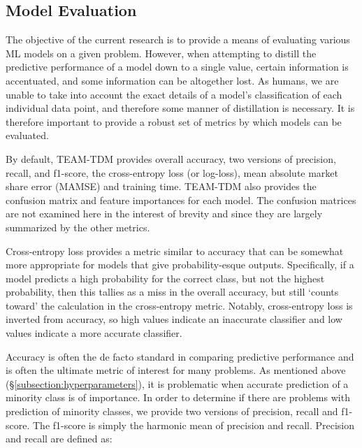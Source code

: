 \documentclass[numbered]{trbunofficial}
\begin{document}
\subsection{Model Evaluation} \label{subsection:evaluation}

The objective of the current research is to provide a means of evaluating various ML models on a given problem.
 However, when attempting to distill the predictive performance of a model down to a single value, certain information is accentuated, and some information can be altogether lost.
 As humans, we are unable to take into account the exact details of a model's classification of each individual data point, and therefore some manner of distillation is necessary.
 It is therefore important to provide a robust set of metrics by which models can be evaluated.

By default, TEAM-TDM provides overall accuracy, two versions of precision, recall, and f1-score, the cross-entropy loss (or log-loss), mean absolute market share error (MAMSE) and training time.
 TEAM-TDM also provides the confusion matrix and feature importances for each model.
 The confusion matrices are not examined here in the interest of brevity and since they are largely summarized by the other metrics.

Cross-entropy loss provides a metric similar to accuracy that can be somewhat more appropriate for models that give probability-esque outputs.
 Specifically, if a model predicts a high probability for the correct class, but not the highest probability, then this tallies as a miss in the overall accuracy, but still `counts toward' the calculation in the cross-entropy metric.
 Notably, cross-entropy loss is inverted from accuracy, so high values indicate an inaccurate classifier and low values indicate a more accurate classifier.

Accuracy is often the de facto standard in comparing predictive performance and is often the ultimate metric of interest for many problems.
 As mentioned above (\S \ref{subsection:hyperparameters}), it is problematic when accurate prediction of a minority class is of importance.
 In order to determine if there are problems with prediction of minority classes, we provide two versions of precision, recall and f1-score.
 The f1-score is simply the harmonic mean of precision and recall.
 Precision and recall are defined as:
\end{document}
